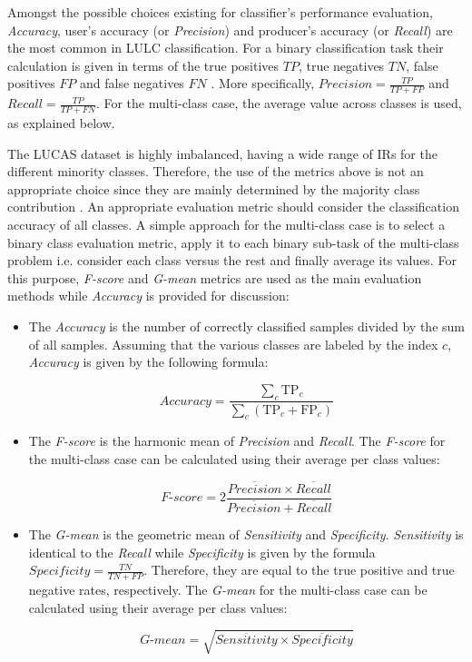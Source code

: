 \documentclass[remotesensing,article,submit,moreauthors,pdftex]{Definitions/mdpi}
\begin{document}
Amongst the possible choices existing for classifier's performance evaluation,
\textit{Accuracy}, user's accuracy (or \textit{Precision}) and
producer's accuracy (or \textit{Recall}) are the most common in LULC
classification. For a binary classification task their calculation is given in
terms of the true positives \( TP \), true negatives \(TN \), false positives
\( FP \) and false negatives \( FN \)
\cite{Liu2007}. More specifically,  \( \textit{Precision} =  \frac{TP}{TP + FP}
\) and \(\textit{Recall} =  \frac{TP}{TP + FN} \). For the multi-class case, the
average value across classes is used, as explained below.

The LUCAS dataset is highly imbalanced, having a wide range of IRs for the
different minority classes. Therefore, the use of the metrics above is not an
appropriate choice since they are mainly determined by the majority class
contribution \cite{He2009}. An appropriate evaluation metric should consider the
classification accuracy of all classes. A simple approach for the multi-class
case is to select a binary class evaluation metric, apply it to each binary
sub-task of the multi-class problem i.e. consider each class versus the rest and
finally average its values. For this purpose, \textit{F-score} and
\textit{G-mean} metrics are used as the main evaluation methods while
\textit{Accuracy} is provided for discussion:

\begin{itemize}

	\renewcommand\labelitemi{--}

	\item The \textit{Accuracy} is the number of correctly classified
	samples divided by the sum of all samples. Assuming that the various classes
	are labeled by the index \( c \), \textit{Accuracy} is given by the
	following formula:

	$$\textit{Accuracy} = \frac{ \sum\limits_{c}{ \text{TP}_{c} } }{
	\sum\limits_{c}{ (\text{TP}_{c}  + \text{FP}_{c}) } } $$

	\item The \textit{F-score} is the harmonic mean of \textit{Precision} and
	\textit{Recall}. The \textit{F-score} for the multi-class case can be
	calculated using their average per class values:

	$$\textit{F-score}=2\frac{\overline{Precision} \times \overline{Recall}}{\overline{Precision} +
	\overline{Recall}}$$

	\item The \textit{G-mean} is the geometric mean of \textit{Sensitivity} and
	\textit{Specificity}. \textit{Sensitivity} is identical to the
	\textit{Recall} while \textit{Specificity} is given by the formula
	\(\textit{Specificity} =  \frac{TN}{TN + FP} \). Therefore, they are equal
	to the true positive and true negative rates, respectively. The
	\textit{G-mean} for the multi-class case can be calculated using their
	average per class values:

	$$\textit{G-mean} = \sqrt{ \overline{Sensitivity} \times
	\overline{Specificity}}$$

\end{itemize}
\end{document}
